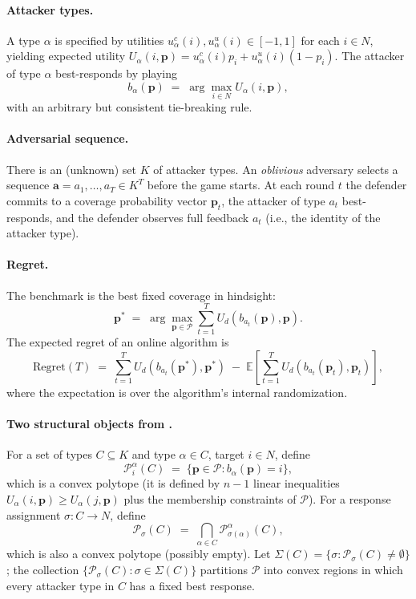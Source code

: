 \documentclass[11pt]{article}
\newcommand{\pvec}{\mathbf{p}}
\newcommand{\avec}{\mathbf{a}}
\newcommand{\cP}{\mathcal{P}}
\newcommand{\EE}{\mathbb{E}}
\begin{document}
\paragraph{Attacker types.} A type $\alpha$ is specified by utilities $u_\alpha^c(i), u_\alpha^u(i)\in[-1,1]$ for each $i\in N$, yielding expected utility $U_\alpha(i,\pvec) = u_\alpha^c(i)p_i + u_\alpha^u(i)(1-p_i)$. The attacker of type $\alpha$ best-responds by playing
\[
b_\alpha(\pvec) \;=\; \arg\max_{i \in N} U_\alpha(i,\pvec),
\]
with an arbitrary but consistent tie-breaking rule.

\paragraph{Adversarial sequence.} There is an (unknown) set $K$ of attacker types. An \emph{oblivious} adversary selects a sequence $\avec = a_1,\dots,a_T \in K^T$ before the game starts. At each round $t$ the defender commits to a coverage probability vector $\pvec_t$, the attacker of type $a_t$ best-responds, and the defender observes full feedback $a_t$ (i.e., the identity of the attacker type).

\paragraph{Regret.} The benchmark is the best fixed coverage in hindsight:
\[
\pvec^{*} \;=\; \arg\max_{\pvec \in \cP} \sum_{t=1}^T U_d(b_{a_t}(\pvec), \pvec).
\]
The expected regret of an online algorithm is
\[
\mathrm{Regret}(T) \;=\; \sum_{t=1}^T U_d(b_{a_t}(\pvec^{*}), \pvec^{*}) \;-\; \EE\!\left[\sum_{t=1}^T U_d(b_{a_t}(\pvec_t), \pvec_t)\right],
\]
where the expectation is over the algorithm's internal randomization.

\paragraph{Two structural objects from \cite{balcan2015}.} For a set of types $C \subseteq K$ and type $\alpha \in C$, target $i\in N$, define
\[
\cP_i^\alpha(C) \;=\; \{\pvec \in \cP : b_\alpha(\pvec) = i\},
\]
which is a convex polytope (it is defined by $n-1$ linear inequalities $U_\alpha(i,\pvec)\ge U_\alpha(j,\pvec)$ plus the membership constraints of $\cP$). For a response assignment $\sigma : C \to N$, define
\[
\cP_\sigma(C) \;=\; \bigcap_{\alpha \in C} \cP_{\sigma(\alpha)}^\alpha(C),
\]
which is also a convex polytope (possibly empty). Let $\Sigma(C) = \{\sigma : \cP_\sigma(C) \ne \emptyset\}$; the collection $\{\cP_\sigma(C) : \sigma \in \Sigma(C)\}$ partitions $\cP$ into convex regions in which every attacker type in $C$ has a fixed best response.
\end{document}
